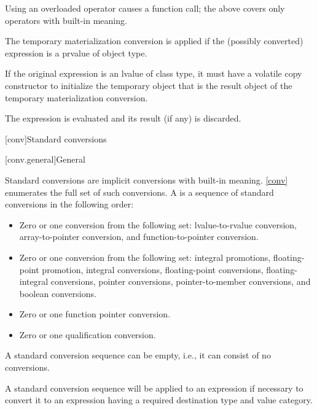 \begin{note}
Using an overloaded operator causes a function call; the
above covers only operators with built-in meaning.
\end{note}
The temporary materialization conversion is applied
if the (possibly converted) expression is a prvalue of object type.
\begin{note}
If the original expression is an lvalue of class type,
it must have a volatile copy constructor to initialize the temporary object
that is the result object of the temporary materialization conversion.
\end{note}
The expression is evaluated and its result (if any) is discarded.

[conv]{Standard conversions}

[conv.general]{General}

%

\pnum
{}%
%
Standard conversions are implicit conversions with built-in meaning.
\ref{conv} enumerates the full set of such conversions. A
 is a sequence of standard
conversions in the following order:

\begin{itemize}
\item Zero or one conversion from the following set: lvalue-to-rvalue
conversion, array-to-pointer conversion, and function-to-pointer
conversion.

\item Zero or one conversion from the following set: integral
promotions, floating-point promotion, integral conversions, floating-point
conversions, floating-integral conversions, pointer conversions,
pointer-to-member conversions, and boolean conversions.

\item Zero or one function pointer conversion.

\item Zero or one qualification conversion.
\end{itemize}

\begin{note}
A standard conversion sequence can be empty, i.e., it can consist of no
conversions.
\end{note}
A standard conversion sequence will be applied to
an expression if necessary to convert it to an expression having
a required destination type and value category.

